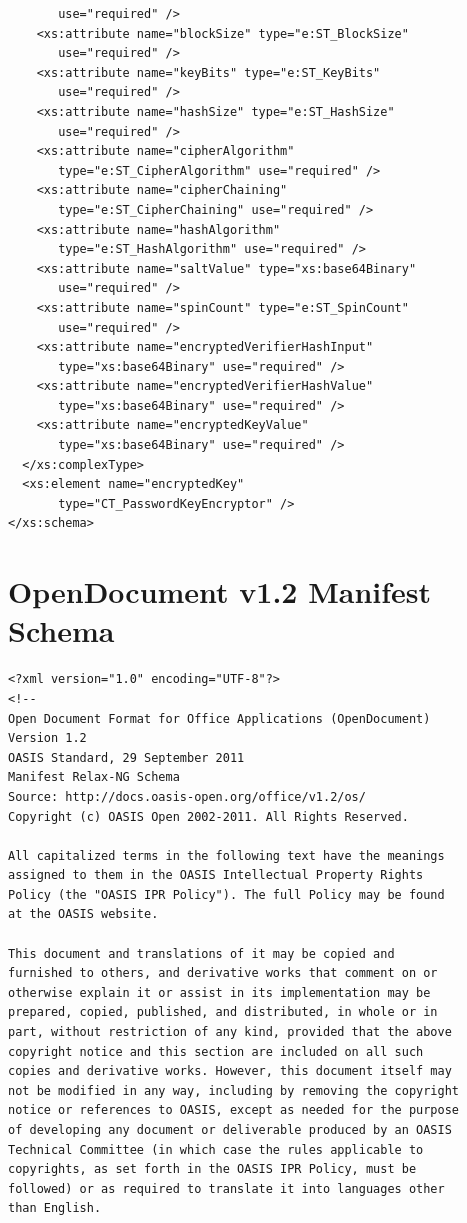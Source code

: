 \documentclass[11pt,oneside]{fithesis2}
\begin{document}
\begin{appendix}
\begin{lstlisting}
       use="required" />
    <xs:attribute name="blockSize" type="e:ST_BlockSize" 
       use="required" /> 
    <xs:attribute name="keyBits" type="e:ST_KeyBits" 
       use="required" />
    <xs:attribute name="hashSize" type="e:ST_HashSize" 
       use="required" /> 
    <xs:attribute name="cipherAlgorithm" 
       type="e:ST_CipherAlgorithm" use="required" /> 
    <xs:attribute name="cipherChaining"
       type="e:ST_CipherChaining" use="required" /> 
    <xs:attribute name="hashAlgorithm" 
       type="e:ST_HashAlgorithm" use="required" /> 
    <xs:attribute name="saltValue" type="xs:base64Binary" 
       use="required" /> 
    <xs:attribute name="spinCount" type="e:ST_SpinCount"
       use="required" />
    <xs:attribute name="encryptedVerifierHashInput"
       type="xs:base64Binary" use="required" /> 
    <xs:attribute name="encryptedVerifierHashValue"
       type="xs:base64Binary" use="required" />
    <xs:attribute name="encryptedKeyValue"
       type="xs:base64Binary" use="required" />
  </xs:complexType> 
  <xs:element name="encryptedKey" 
       type="CT_PasswordKeyEncryptor" />
</xs:schema>
	\end{lstlisting}

	\section{OpenDocument v1.2 Manifest Schema}\label{manifest_xml_schema}
	\begin{lstlisting}
<?xml version="1.0" encoding="UTF-8"?>
<!--
Open Document Format for Office Applications (OpenDocument)
Version 1.2
OASIS Standard, 29 September 2011
Manifest Relax-NG Schema
Source: http://docs.oasis-open.org/office/v1.2/os/
Copyright (c) OASIS Open 2002-2011. All Rights Reserved.

All capitalized terms in the following text have the meanings
assigned to them in the OASIS Intellectual Property Rights
Policy (the "OASIS IPR Policy"). The full Policy may be found
at the OASIS website.

This document and translations of it may be copied and 
furnished to others, and derivative works that comment on or
otherwise explain it or assist in its implementation may be
prepared, copied, published, and distributed, in whole or in
part, without restriction of any kind, provided that the above
copyright notice and this section are included on all such 
copies and derivative works. However, this document itself may
not be modified in any way, including by removing the copyright
notice or references to OASIS, except as needed for the purpose
of developing any document or deliverable produced by an OASIS
Technical Committee (in which case the rules applicable to 
copyrights, as set forth in the OASIS IPR Policy, must be
followed) or as required to translate it into languages other 
than English.


\end{lstlisting}
\end{appendix}
\end{document}

